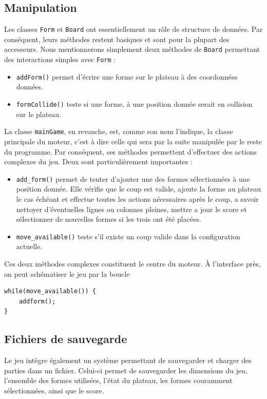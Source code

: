 \documentclass[11pt,a4paper]{article}
\begin{document}
\subsection{Manipulation}
Les classes \verb"Form" et \verb"Board" ont essentiellement un rôle de structure de données. Par conséquent, leurs méthodes restent basiques et sont pour la plupart des accesseurs. Nous mentionnerons simplement deux méthodes de \verb"Board" permettant des interactions simples avec \verb"Form" : 
\begin{itemize}
\item \verb"addForm()" permet d'écrire une forme sur le plateau à des coordonnées données.
\item \verb"formCollide()" teste si une forme, à une position donnée serait en collision sur le plateau.
\end{itemize}

\medskip
La classe \verb"mainGame", en revanche, est, comme son nom l'indique, la classe principale du moteur, c'est à dire celle qui sera par la suite manipulée par le reste du programme. Par conséquent, ses méthodes permettent d'effectuer des actions complexes du jeu. Deux sont particulièrement importantes :
\begin{itemize}
\item \verb"add_form()" permet de tenter d'ajouter une des formes sélectionnées à une position donnée. Elle vérifie que le coup est valide, ajoute la forme au plateau le cas échéant et effectue toutes les actions nécessaires après le coup, a savoir nettoyer d'éventuelles lignes ou colonnes pleines, mettre a jour le score et sélectionner de nouvelles formes si les trois ont été placées.
\item \verb"move_available()" teste s'il existe un coup valide dans la configuration actuelle.
\end{itemize}

\medskip
Ces deux méthodes complexes constituent le centre du moteur. À l'interface près, on peut schématiser le jeu par la boucle
\begin{verbatim}
while(move_available()) {
    addform();
}
\end{verbatim}



\subsection{Fichiers de sauvegarde}
Le jeu intègre également un système permettant de sauvegarder et charger des parties dans un fichier. Celui-ci permet de sauvegarder les dimensions du jeu, l'ensemble des formes utilisées, l'état du plateau, les formes couramment sélectionnées, ainsi que le score.
\end{document}
